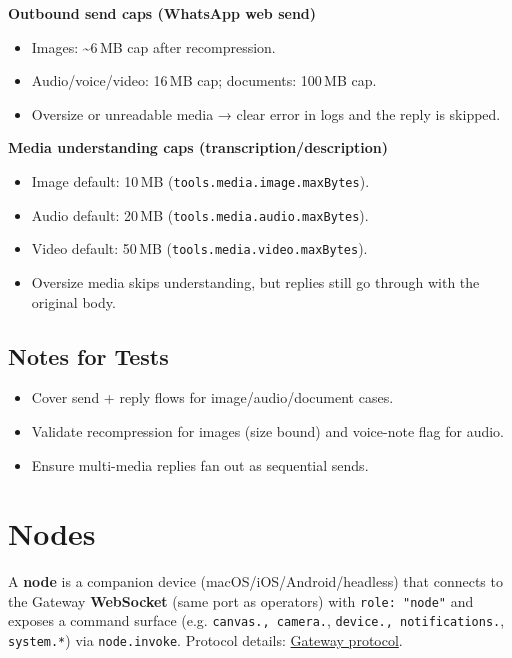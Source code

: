 \textbf{Outbound send caps (WhatsApp web send)}

\begin{itemize}
  \item Images: \textasciitilde{}6 MB cap after recompression.
  \item Audio/voice/video: 16 MB cap; documents: 100 MB cap.
  \item Oversize or unreadable media → clear error in logs and the reply is skipped.
\end{itemize}


\textbf{Media understanding caps (transcription/description)}

\begin{itemize}
  \item Image default: 10 MB (\texttt{tools.media.image.maxBytes}).
  \item Audio default: 20 MB (\texttt{tools.media.audio.maxBytes}).
  \item Video default: 50 MB (\texttt{tools.media.video.maxBytes}).
  \item Oversize media skips understanding, but replies still go through with the original body.
\end{itemize}


\subsection{Notes for Tests}


\begin{itemize}
  \item Cover send + reply flows for image/audio/document cases.
  \item Validate recompression for images (size bound) and voice-note flag for audio.
  \item Ensure multi-media replies fan out as sequential sends.
\end{itemize}



\clearpage

\section{Nodes}


A \textbf{node} is a companion device (macOS/iOS/Android/headless) that connects to the Gateway \textbf{WebSocket} (same port as operators) with \texttt{role: "node"} and exposes a command surface (e.g. \texttt{canvas.\textit{}, \texttt{camera.}}, \texttt{device.\textit{}, \texttt{notifications.}}, \texttt{system.*}) via \texttt{node.invoke}. Protocol details: \href{/gateway/protocol}{Gateway protocol}.

